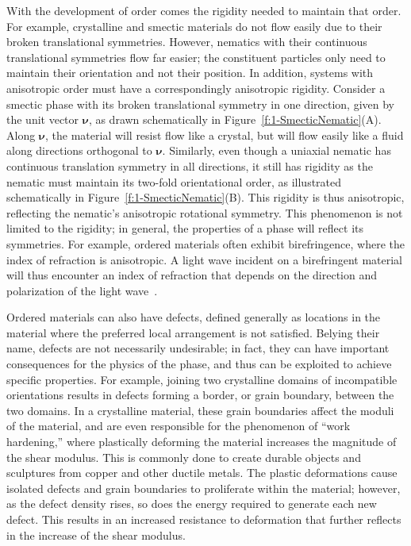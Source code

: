 With the development of order comes the rigidity needed to maintain that order.
For example, crystalline and smectic materials do not flow easily due to their broken translational symmetries.
However, nematics with their continuous translational symmetries flow far easier; the constituent particles only need to maintain their orientation and not their position.
In addition, systems with anisotropic order must have a correspondingly anisotropic rigidity.
Consider a smectic phase with its broken translational symmetry in one direction, given by the unit vector $\bm{\nu}$, as drawn schematically in Figure~\ref{f:1-SmecticNematic}(A).
Along $\bm{\nu}$, the material will resist flow like a crystal, but will flow easily like a fluid along directions orthogonal to $\bm{\nu}$.
Similarly, even though a uniaxial nematic has continuous translation symmetry in all directions, it still has rigidity as the nematic must maintain its two-fold orientational order, as illustrated schematically in Figure~\ref{f:1-SmecticNematic}(B).
This rigidity is thus anisotropic, reflecting the nematic's anisotropic rotational symmetry.
This phenomenon is not limited to the rigidity; in general, the properties of a phase will reflect its symmetries.
For example, ordered materials often exhibit birefringence, where the index of refraction is anisotropic.
A light wave incident on a birefringent material will thus encounter an index of refraction that depends on the direction and polarization of the light wave~\cite{RN175}.

Ordered materials can also have defects, defined generally as locations in the material where the preferred local arrangement is not satisfied.
Belying their name, defects are not necessarily undesirable; in fact, they can have important consequences for the physics of the phase, and thus can be exploited to achieve specific properties.
For example, joining two crystalline domains of incompatible orientations results in defects forming a border, or grain boundary, between the two domains.
In a crystalline material, these grain boundaries affect the moduli of the material, and are even responsible for the phenomenon of ``work hardening,'' where plastically deforming the material increases the magnitude of the shear modulus.
This is commonly done to create durable objects and sculptures from copper and other ductile metals.
The plastic deformations cause isolated defects and grain boundaries to proliferate within the material; however, as the defect density rises, so does the energy required to generate each new defect.
This results in an increased resistance to deformation that further reflects in the increase of the shear modulus.

